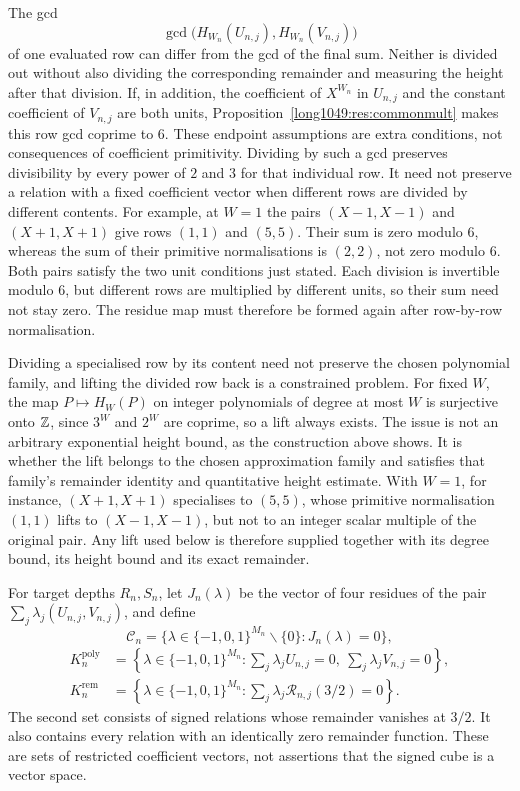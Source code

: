 \documentclass[11pt]{article}
\begin{document}
The gcd
\[
 \gcd\!\bigl(H_{W_n}(U_{n,j}),H_{W_n}(V_{n,j})\bigr)
\]
of one evaluated row can differ from the gcd of the final sum. Neither
is divided out without also dividing the corresponding remainder and
measuring the height after that division. If, in addition, the
coefficient of $X^{W_n}$ in $U_{n,j}$ and the constant coefficient of
$V_{n,j}$ are both units, Proposition~\ref{long1049:res:commonmult}
makes this row gcd coprime to $6$. These endpoint assumptions are
extra conditions, not consequences of coefficient primitivity.
Dividing by such a gcd preserves divisibility by every power of $2$
and $3$ for that individual row. It need not preserve a relation
with a fixed coefficient vector when different rows are divided by different
contents. For example, at $W=1$ the pairs $(X-1,X-1)$ and $(X+1,X+1)$
give rows $(1,1)$ and $(5,5)$. Their sum is zero modulo $6$, whereas
the sum of their primitive normalisations is $(2,2)$, not zero modulo
$6$. Both pairs satisfy the two unit conditions just stated. Each division is invertible modulo $6$, but different rows are
multiplied by different units, so their sum need not stay zero.
The residue map must therefore be formed again after row-by-row
normalisation.

Dividing a specialised row by its content need not preserve the chosen
polynomial family, and lifting the divided row back is a constrained problem. For fixed $W$, the map $P\mapsto H_W(P)$ on integer polynomials of
degree at most $W$ is surjective onto $\mathbb{Z}$, since $3^{W}$ and $2^{W}$ are
coprime, so a lift always exists. The issue is not an arbitrary exponential
height bound, as the construction above shows. It is whether the lift
belongs to the chosen approximation family and satisfies that family's
remainder identity and quantitative height estimate. With $W=1$,
for instance, $(X+1,X+1)$ specialises to $(5,5)$, whose primitive
normalisation $(1,1)$ lifts to $(X-1,X-1)$, but not to an integer scalar
multiple of the original pair.  Any lift used below is therefore supplied together with its
degree bound, its height bound and its exact remainder.

For target depths $R_n,S_n$, let $J_n(\lambda)$ be the vector of four residues of
the pair $\sum_j\lambda_j(U_{n,j},V_{n,j})$, and define
\[
 \mathcal C_n=
 \{\lambda\in\{-1,0,1\}^{M_n}\mathbin{\backslash}\{0\}:J_n(\lambda)=0\},
\]
\[
\begin{aligned}
 K_n^{\mathrm{poly}}
   &=\left\{\lambda\in\{-1,0,1\}^{M_n}:
       \sum_j\lambda_jU_{n,j}=0,\ \sum_j\lambda_jV_{n,j}=0\right\},\\
 K_n^{\mathrm{rem}}
   &=\left\{\lambda\in\{-1,0,1\}^{M_n}:
       \sum_j\lambda_j\mathcal R_{n,j}(3/2)=0\right\}.
\end{aligned}
\]
The second set consists of signed relations whose remainder vanishes
at $3/2$. It also contains every relation with an identically zero
remainder function. These are sets of restricted coefficient vectors,
not assertions that the signed cube is a vector space.
\end{document}
